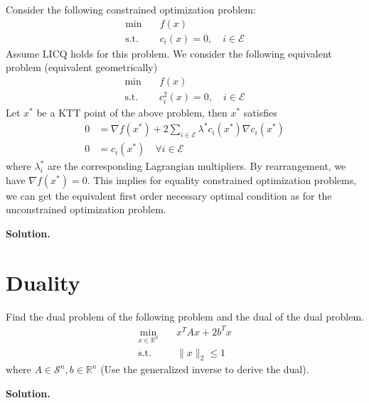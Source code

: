 \documentclass{article}
\begin{document}
\bigskip
Consider the following constrained optimization problem:
\begin{align*}
    \min \quad &f(x) \\
    \text{s.t.} \quad &c_i(x) = 0, \quad i \in \mathcal E 
\end{align*}
Assume LICQ holds for this problem. We consider the following equivalent problem (equivalent geometrically)
\begin{align*}
    \min \quad &f(x) \\
    \text{s.t.} \quad &c_i^2(x) = 0, \quad i \in \mathcal E
\end{align*}
Let $x^*$ be a KTT point of the above problem, then $x^*$ satisfies 
\begin{align*}
    0 &= \nabla f(x^*) + 2 \sum_{i \in \mathcal E} \lambda^* c_i(x^*) \nabla c_i(x^*) \\
    0 &= c_i(x^*) \quad \forall i \in \mathcal E
\end{align*}
where $\lambda_i^*$ are the corresponding Lagrangian multipliers. By rearrangement, we have $\nabla f(x^*) = 0$. This implies for equality constrained optimization problems, we can get the equivalent first order necessary optimal condition as for the unconstrained optimization problem.

\textbf{Solution.}

\section{Duality}
Find the dual problem of the following problem and the dual of the dual problem.
\begin{align*}
    \min_{x \in \mathbb R^n} \quad & x^TAx + 2b^T x \\
    \text{s.t.} \quad & \|x\|_2 \leq 1
\end{align*}
where $A \in \mathcal S^n, b \in \mathbb R^n$ (Use the generalized inverse to derive the dual).

\textbf{Solution.}
\end{document}
